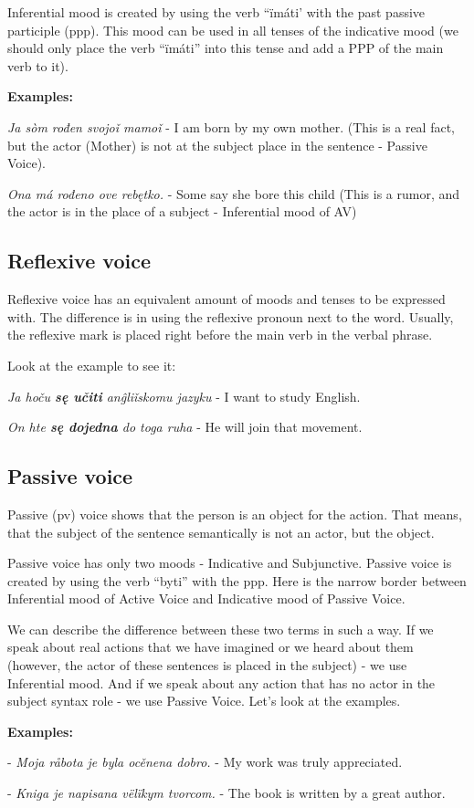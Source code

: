 
Inferential mood is created by using the verb “ïmáti’ with the past passive participle (\gls{ppp}). This mood can be used in all tenses of the indicative mood (we should only place the verb “ïmáti” into this tense and add a PPP of the main verb to it). 

\textbf{Examples:}

\textit{Ja sòm rođen svojoǐ mamoǐ} - I am born by my own mother. (This is a real fact, but the actor (Mother) is not at the subject place in the sentence - Passive Voice).

\textit{Ona má rođeno ove rebętko.} - Some say she bore this child (This is a rumor, and the actor is in the place of a subject - Inferential mood of AV)

\subsection{Reflexive voice}

Reflexive voice has an equivalent amount of moods and tenses to be expressed with. The difference is in using the reflexive pronoun next to the word. Usually, the reflexive mark is placed right before the main verb in the verbal phrase.

Look at the example to see it:

\textit{Ja hoču \textbf{sę učiti} anĝliǐskomu jazyku} - I want to study English.

\textit{On hte \textbf{sę dojedna} do toga ruha} - He will join that movement.

\subsection{Passive voice}


Passive (\gls{pv}) voice shows that the person is an object for the action. That means, that the subject of the sentence semantically is not an actor, but the object. 

Passive voice has only two moods - Indicative and Subjunctive. Passive voice is created by using the verb “byti” with the \gls{ppp}. Here is the narrow border between Inferential mood of Active Voice and Indicative mood of Passive Voice.

We can describe the difference between these two terms in such a way. If we speak about real actions that we have imagined or we heard about them (however, the actor of these sentences is placed in the subject) - we use Inferential mood. And if we speak about any action that has no actor in the subject syntax role - we use Passive Voice. Let’s look at the examples.

\textbf{Examples:}

- \textit{Moja råbota je byla ocěnena dobro.} - My work was truly appreciated.

- \textit{Kniga je napisana vëlïkym tvorcom.} - The book is written by a great author.





